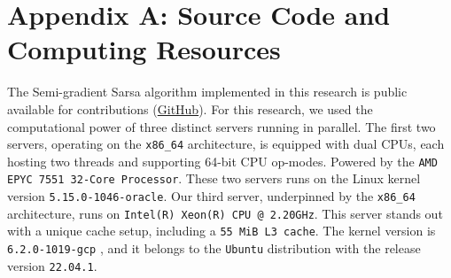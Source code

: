 \documentclass[10pt,twocolumn]{article}
\begin{document}
\section{Appendix A: Source Code and Computing Resources}
The Semi-gradient Sarsa algorithm implemented in this research is public available for contributions (\href{https:\\github.com/mauriciocoder/mountain-car/tree/main}{GitHub}).
For this research, we used the computational power of three distinct servers running in parallel.
The first two servers, operating on the \texttt{x86\_64} architecture, is equipped with dual CPUs, each hosting two threads and supporting 64-bit CPU op-modes. 
Powered by the \texttt{AMD EPYC 7551 32-Core Processor}. These two servers runs on the Linux kernel version \texttt{5.15.0-1046-oracle}.
Our third server, underpinned by the \texttt{x86\_64} architecture, runs on \texttt{Intel(R) Xeon(R) CPU @ 2.20GHz}.
This server stands out with a unique cache setup, including a \texttt{55 MiB L3 cache}. The kernel version is \texttt{6.2.0-1019-gcp}
, and it belongs to the \texttt{Ubuntu} distribution with the release version \texttt{22.04.1}.



\end{document}

